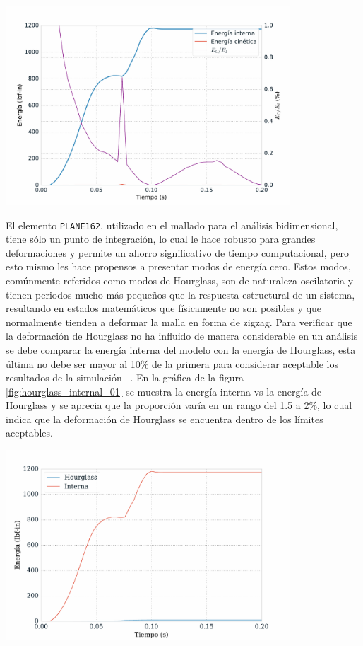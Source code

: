 \begin{center}
\includegraphics[width=0.8\textwidth]{src/ch4/energy_status_01.pdf}
\label{fig:energy_status_01}
\end{center}

El elemento \texttt{PLANE162}, utilizado en el mallado para el análisis bidimensional, 
tiene sólo un punto de integración, lo cual le hace robusto para grandes deformaciones 
y permite un ahorro significativo de tiempo computacional, pero esto mismo les hace 
propensos a presentar modos de energía cero. Estos modos, comúnmente referidos como 
modos de Hourglass, son de naturaleza oscilatoria y tienen periodos mucho más pequeños 
que la respuesta estructural de un sistema, resultando en estados matemáticos que físicamente 
no son posibles y que normalmente tienden a deformar la malla en forma de zigzag.
Para verificar que la deformación de Hourglass no ha influido de manera considerable 
en un análisis se debe comparar la energía interna del modelo con la energía de Hourglass, 
esta última no debe ser mayor al 10\% de la primera para considerar aceptable los 
resultados de la simulación ~\cite{lsdyna-ansys-manual}. En la gráfica de la figura \ref{fig:hourglass_internal_01} 
se muestra la energía interna vs la energía de Hourglass y se aprecia que la proporción 
varía en un rango del 1.5 a 2\%, lo cual indica que la deformación de Hourglass se encuentra 
dentro de los límites aceptables.

\begin{center}
\includegraphics[width=0.8\textwidth]{src/ch4/hourglass_internal_01.pdf}
\label{fig:hourglass_internal_01}
\end{center}


